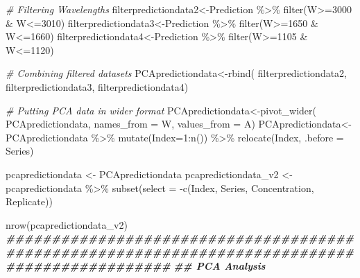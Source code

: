 \documentclass[
]{article}
\newenvironment{Shaded}{\begin{snugshade}}{\end{snugshade}}
\newcommand{\AttributeTok}[1]{\textcolor[rgb]{0.77,0.63,0.00}{#1}}
\newcommand{\CommentTok}[1]{\textcolor[rgb]{0.56,0.35,0.01}{\textit{#1}}}
\newcommand{\DecValTok}[1]{\textcolor[rgb]{0.00,0.00,0.81}{#1}}
\newcommand{\DocumentationTok}[1]{\textcolor[rgb]{0.56,0.35,0.01}{\textbf{\textit{#1}}}}
\newcommand{\FunctionTok}[1]{\textcolor[rgb]{0.00,0.00,0.00}{#1}}
\newcommand{\NormalTok}[1]{#1}
\newcommand{\OtherTok}[1]{\textcolor[rgb]{0.56,0.35,0.01}{#1}}
\newcommand{\SpecialCharTok}[1]{\textcolor[rgb]{0.00,0.00,0.00}{#1}}
\begin{document}
\begin{Shaded}
\begin{Highlighting}[]
  \CommentTok{\# Filtering Wavelengths}
\NormalTok{  filterpredictiondata2}\OtherTok{\textless{}{-}}\NormalTok{Prediction }\SpecialCharTok{\%\textgreater{}\%} \FunctionTok{filter}\NormalTok{(W}\SpecialCharTok{\textgreater{}=}\DecValTok{3000} \SpecialCharTok{\&}\NormalTok{ W}\SpecialCharTok{\textless{}=}\DecValTok{3010}\NormalTok{)}
\NormalTok{  filterpredictiondata3}\OtherTok{\textless{}{-}}\NormalTok{Prediction }\SpecialCharTok{\%\textgreater{}\%} \FunctionTok{filter}\NormalTok{(W}\SpecialCharTok{\textgreater{}=}\DecValTok{1650} \SpecialCharTok{\&}\NormalTok{ W}\SpecialCharTok{\textless{}=}\DecValTok{1660}\NormalTok{)}
\NormalTok{  filterpredictiondata4}\OtherTok{\textless{}{-}}\NormalTok{Prediction }\SpecialCharTok{\%\textgreater{}\%} \FunctionTok{filter}\NormalTok{(W}\SpecialCharTok{\textgreater{}=}\DecValTok{1105} \SpecialCharTok{\&}\NormalTok{ W}\SpecialCharTok{\textless{}=}\DecValTok{1120}\NormalTok{)}
  
  \CommentTok{\# Combining filtered datasets}
\NormalTok{  PCApredictiondata}\OtherTok{\textless{}{-}}\FunctionTok{rbind}\NormalTok{( filterpredictiondata2, filterpredictiondata3, filterpredictiondata4) }
 
  \CommentTok{\# Putting PCA data in wider format}
\NormalTok{  PCApredictiondata}\OtherTok{\textless{}{-}}\FunctionTok{pivot\_wider}\NormalTok{( PCApredictiondata, }\AttributeTok{names\_from =}\NormalTok{ W, }\AttributeTok{values\_from =}\NormalTok{ A)}
\NormalTok{  PCApredictiondata}\OtherTok{\textless{}{-}}\NormalTok{ PCApredictiondata }\SpecialCharTok{\%\textgreater{}\%} \FunctionTok{mutate}\NormalTok{(}\AttributeTok{Index=}\DecValTok{1}\SpecialCharTok{:}\FunctionTok{n}\NormalTok{()) }\SpecialCharTok{\%\textgreater{}\%} \FunctionTok{relocate}\NormalTok{(Index, }\AttributeTok{.before =}\NormalTok{ Series)}
  
\NormalTok{  pcapredictiondata }\OtherTok{\textless{}{-}}\NormalTok{  PCApredictiondata}
\NormalTok{  pcapredictiondata\_v2 }\OtherTok{\textless{}{-}}\NormalTok{  pcapredictiondata }\SpecialCharTok{\%\textgreater{}\%} \FunctionTok{subset}\NormalTok{(}\AttributeTok{select =} \SpecialCharTok{{-}}\FunctionTok{c}\NormalTok{(Index, Series, Concentration, Replicate))}
  
  \FunctionTok{nrow}\NormalTok{(pcapredictiondata\_v2)}
  \DocumentationTok{\#\#\#\#\#\#\#\#\#\#\#\#\#\#\#\#\#\#\#\#\#\#\#\#\#\#\#\#\#\#\#\#\#\#\#\#\#\#\#\#\#\#\#\#\#\#\#\#\#\#\#\#\#\#\#\#\#\#\#\#\#\#\#\#\#\#\#\#\#\#\#\#\#\#\#\#\#\#\#\#\#\#\#\#\#\#\#\#\#\#\#\#\#\#}
  \DocumentationTok{\#\# PCA Analysis}
  

\end{Highlighting}
\end{Shaded}
\end{document}
